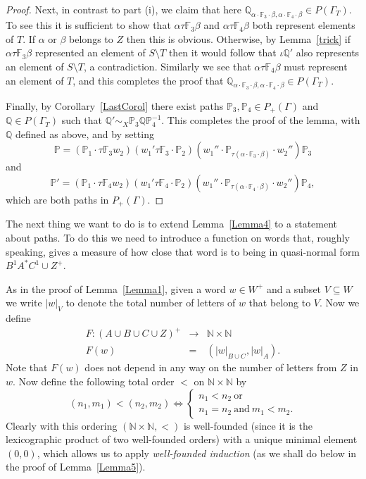 \documentclass[11pt]{amsart}
\theoremstyle{plain}
\begin{document}
\begin{proof}
Next, in contrast to part (i), we claim that here ${\mathbb{Q}}_{\alpha \cdot {\mathbb{F}}_3 \cdot \beta, \alpha \cdot {\mathbb{F}}_4 \cdot \beta} \in P(\Gamma_T)$. To see this it is sufficient to show that $\alpha \tau {\mathbb{F}}_3 \beta$ and $\alpha \tau {\mathbb{F}}_4 \beta$ both represent elements of $T$. If $\alpha$ or $\beta$ belongs to $Z$ then this is obvious. Otherwise, by Lemma~\ref{trick} if $\alpha \tau {\mathbb{F}}_3 \beta$ represented an element of $S \setminus T$ then it would follow that $\iota {\mathbb{Q}}'$ also represents an element of $S \setminus T$, a contradiction. Similarly we see that $\alpha \tau {\mathbb{F}}_4 \beta$ must represent an element of $T$, and this completes the proof that ${\mathbb{Q}}_{\alpha \cdot {\mathbb{F}}_3 \cdot \beta, \alpha \cdot {\mathbb{F}}_4 \cdot \beta} \in P(\Gamma_T)$. 

Finally, by Corollary~\ref{LastCorol} there exist paths ${\mathbb{P}}_3, {\mathbb{P}}_4 \in P_+(\Gamma)$ and ${\mathbb{Q}} \in P(\Gamma_T)$ such that ${\mathbb{Q}}' \sim_{X} {\mathbb{P}}_3 {\mathbb{Q}} {\mathbb{P}}_4^{-1}$. This completes the proof of the lemma, with ${\mathbb{Q}}$ defined as above, and by setting
\[
{\mathbb{P}} = ({\mathbb{P}}_1 \cdot \tau {\mathbb{F}}_3 w_2)
(w_1' \tau {\mathbb{F}}_3 \cdot {\mathbb{P}}_2)
(w_1'' \cdot  {\mathbb{P}}_{\tau(\alpha \cdot {\mathbb{F}}_3 \cdot \beta)}  \cdot w_2'')
{\mathbb{P}}_3
\] 
and
\[
{\mathbb{P}}' = ({\mathbb{P}}_1 \cdot \tau {\mathbb{F}}_4 w_2)
(w_1' \tau {\mathbb{F}}_4 \cdot {\mathbb{P}}_2)
(w_1'' \cdot  {\mathbb{P}}_{\tau(\alpha \cdot {\mathbb{F}}_4 \cdot \beta)}  \cdot w_2'')
{\mathbb{P}}_4,
\]
which are both paths in $P_+(\Gamma)$. 
\end{proof}
The next thing we want to do is to extend Lemma~\ref{Lemma4} to a statement about paths. To do this we need to introduce a function on words that, roughly speaking, gives a measure of how close that word is to being in quasi-normal form $B^1 A^* C^1 \cup Z^+$. 

As in the proof of Lemma~\ref{Lemma1}, given a word $w \in W^+$ and a subset $V \subseteq W$ we write $|w|_V$ to denote the total number of letters of $w$ that belong to $V$. Now we define  
$$
\begin{array}{rcl}
F: (A \cup B \cup C \cup Z)^+ & \rightarrow & \mathbb{N} \times \mathbb{N} \\
F(w) & = & (|w|_{B \cup C}, |w|_A).
\end{array}
$$
Note that $F(w)$ does not depend in any way on the number of letters from $Z$ in $w$. 
Now define the following total order $<$ on $\mathbb{N} \times \mathbb{N}$ by
\[
(n_1,m_1) < (n_2,m_2) \Leftrightarrow
\begin{cases}
n_1 < n_2 \ \mbox{or} \\
n_1 = n_2 \ \mbox{and} \ m_1 < m_2.
\end{cases}
\]
Clearly with this ordering $(\mathbb{N} \times \mathbb{N}, <)$ is well-founded (since it is the lexicographic product of two well-founded orders) with a unique minimal element $(0,0)$, which allows us to apply \emph{well-founded induction} (as we shall do below in the proof of Lemma~\ref{Lemma5}). 
\end{document}
